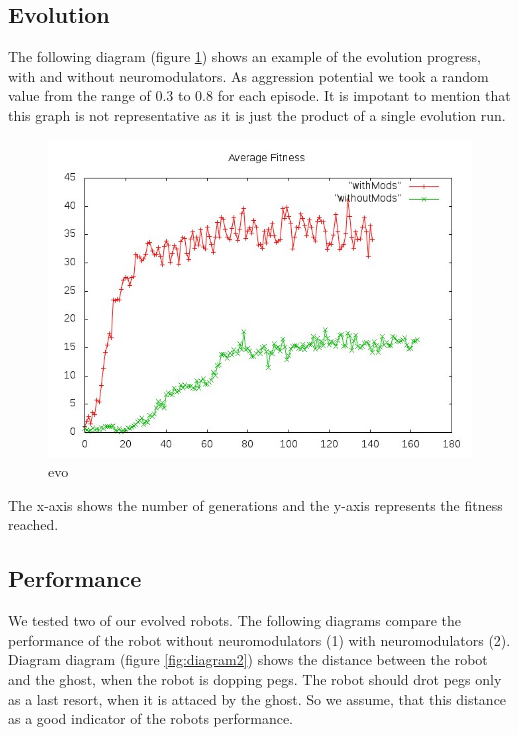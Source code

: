 \documentclass[12pt,fleqn,a4paper]{article}
\begin{document}
\subsection{Evolution}
The following diagram (figure \ref{fig:diagram1}) shows an example of the evolution progress, with and without neuromodulators. As aggression potential we took a random value from the range of 0.3 to 0.8 for each episode. It is impotant to mention that this graph is not representative as it is just the product of a single evolution run.
\begin{figure}[h]
\centering
\includegraphics[scale=0.7]{img/evoAvg.jpg}
\caption{evo}
\label{fig:diagram1}
\end{figure}

The x-axis shows the number of generations and the y-axis represents the fitness reached.

\subsection{Performance}
We tested two of our evolved robots. The following diagrams compare the performance of the robot without neuromodulators (1) with neuromodulators (2). Diagram diagram (figure \ref{fig:diagram2}) shows the distance between the robot and the ghost, when the robot is dopping pegs. The robot should drot pegs only as a last resort, when it is attaced by the ghost. So we assume, that this distance as a good indicator of the robots performance.
\end{document}
